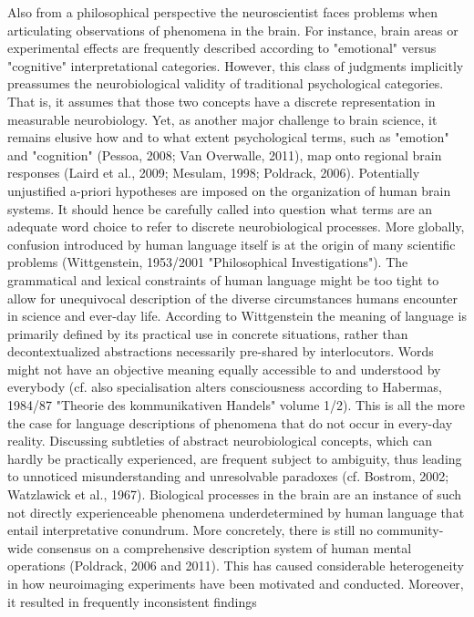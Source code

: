 \documentclass[authoryear,review,3p]{elsarticle}
\begin{document}
Also from a philosophical perspective
the neuroscientist faces problems when articulating observations of
phenomena in the brain.
%
For instance, brain areas or experimental effects are frequently
described according to "emotional" versus "cognitive"
interpretational categories.
However, this class of judgments implicitly preassumes
the neurobiological validity of traditional psychological categories.
That is, it assumes that those two concepts have
a discrete representation in measurable neurobiology.
Yet, as another major challenge to brain science,
it remains elusive how and to what extent psychological terms,
such as "emotion" and "cognition" (Pessoa, 2008; Van Overwalle, 2011),
map onto regional brain responses
(Laird et al., 2009; Mesulam, 1998; Poldrack, 2006). 
Potentially unjustified a-priori hypotheses are imposed
on the organization of human brain systems.
%
It should hence be carefully called into question what terms
are an adequate word choice to refer to discrete
neurobiological processes.
More globally,
confusion introduced by human language itself is at the origin
of many scientific problems
(Wittgenstein, 1953/2001 "Philosophical Investigations").
The grammatical and lexical constraints of human language might be
too tight to allow for unequivocal description of the diverse
circumstances humans encounter in science and ever-day life.
According to Wittgenstein the meaning of language is primarily
defined by its practical use in concrete situations,
rather than decontextualized abstractions necessarily pre-shared
by interlocutors.
Words might not have an objective meaning
equally accessible to and understood by everybody
(cf. also specialisation alters consciousness according to
Habermas, 1984/87 "Theorie des kommunikativen Handels" volume 1/2).
This is all the more the case for language descriptions
of phenomena that do not occur in every-day reality.
Discussing subtleties of abstract neurobiological concepts,
which can hardly be practically experienced,
are frequent subject to ambiguity, thus leading to
unnoticed misunderstanding and unresolvable paradoxes
(cf. Bostrom, 2002; Watzlawick et al., 1967).
Biological processes in the brain are an instance of
such not directly experienceable phenomena underdetermined
by human language that entail interpretative conundrum.
%
More concretely,
there is still no community-wide consensus on
a comprehensive description system of
human mental operations (Poldrack, 2006 and 2011).
This has caused considerable heterogeneity in
how neuroimaging experiments have been motivated and conducted.
Moreover, it resulted in frequently inconsistent findings
\end{document}
